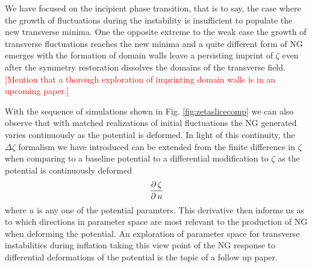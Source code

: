 We have focused on the incipient phase transition, that is to say, the case where the growth of fluctuations during the instability is insufficient to populate the new transverse minima. One the opposite extreme to the weak case the growth of transverse fluctuations reaches the new minima and a quite different form of NG emerges with the formation of domain walls leave a persisting imprint of $\zeta$ even after the symmetry restoration dissolves the domains of the transverse field.
\textcolor{red}{[Mention that a thorough exploration of imprinting domain walls is in an upcoming paper.]}

\Fzetaslicecomp

\Fpotparamcomp




\Fzetapkcomp

\Fzetapdfcomp


With the sequence of simulations shown in Fig. \ref{fig:zetaslicecomp} we can also observe that with matched realizations of initial fluctuations the NG generated varies continuously as the potential is deformed. In light of this continuity, the $\Delta\zeta$ formalism we have introduced can be extended from the finite difference in $\zeta$ when comparing to a baseline potential to a differential modification to $\zeta$ as the potential is continuously deformed
\begin{equation}
  \frac{\partial\, \zeta}{\partial\, u}
\end{equation}
where $u$ is any one of the potential paramters.
This derivative then informs us as to which directions in parameter space are most relevant to the production of NG when deforming the potential. An exploration of parameter space for transverse instabilities during inflation taking this view point of the NG response to differential deformations of the potential is the topic of a follow up paper. 


